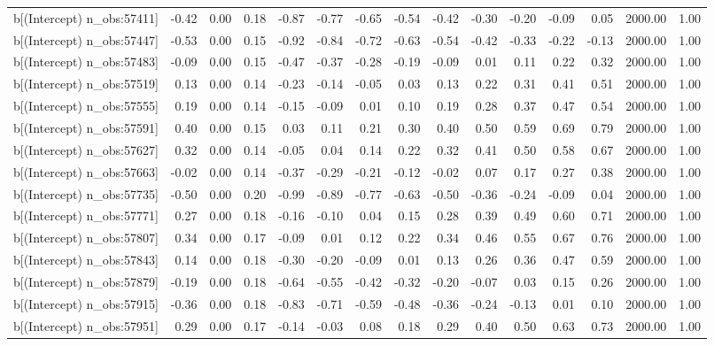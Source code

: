 \begin{table}[ht]
\begin{tabular}{rrrrrrrrrrrrrrr}
  b[(Intercept) n\_obs:57411] & -0.42 & 0.00 & 0.18 & -0.87 & -0.77 & -0.65 & -0.54 & -0.42 & -0.30 & -0.20 & -0.09 & 0.05 & 2000.00 & 1.00 \\ 
  b[(Intercept) n\_obs:57447] & -0.53 & 0.00 & 0.15 & -0.92 & -0.84 & -0.72 & -0.63 & -0.54 & -0.42 & -0.33 & -0.22 & -0.13 & 2000.00 & 1.00 \\ 
  b[(Intercept) n\_obs:57483] & -0.09 & 0.00 & 0.15 & -0.47 & -0.37 & -0.28 & -0.19 & -0.09 & 0.01 & 0.11 & 0.22 & 0.32 & 2000.00 & 1.00 \\ 
  b[(Intercept) n\_obs:57519] & 0.13 & 0.00 & 0.14 & -0.23 & -0.14 & -0.05 & 0.03 & 0.13 & 0.22 & 0.31 & 0.41 & 0.51 & 2000.00 & 1.00 \\ 
  b[(Intercept) n\_obs:57555] & 0.19 & 0.00 & 0.14 & -0.15 & -0.09 & 0.01 & 0.10 & 0.19 & 0.28 & 0.37 & 0.47 & 0.54 & 2000.00 & 1.00 \\ 
  b[(Intercept) n\_obs:57591] & 0.40 & 0.00 & 0.15 & 0.03 & 0.11 & 0.21 & 0.30 & 0.40 & 0.50 & 0.59 & 0.69 & 0.79 & 2000.00 & 1.00 \\ 
  b[(Intercept) n\_obs:57627] & 0.32 & 0.00 & 0.14 & -0.05 & 0.04 & 0.14 & 0.22 & 0.32 & 0.41 & 0.50 & 0.58 & 0.67 & 2000.00 & 1.00 \\ 
  b[(Intercept) n\_obs:57663] & -0.02 & 0.00 & 0.14 & -0.37 & -0.29 & -0.21 & -0.12 & -0.02 & 0.07 & 0.17 & 0.27 & 0.38 & 2000.00 & 1.00 \\ 
  b[(Intercept) n\_obs:57735] & -0.50 & 0.00 & 0.20 & -0.99 & -0.89 & -0.77 & -0.63 & -0.50 & -0.36 & -0.24 & -0.09 & 0.04 & 2000.00 & 1.00 \\ 
  b[(Intercept) n\_obs:57771] & 0.27 & 0.00 & 0.18 & -0.16 & -0.10 & 0.04 & 0.15 & 0.28 & 0.39 & 0.49 & 0.60 & 0.71 & 2000.00 & 1.00 \\ 
  b[(Intercept) n\_obs:57807] & 0.34 & 0.00 & 0.17 & -0.09 & 0.01 & 0.12 & 0.22 & 0.34 & 0.46 & 0.55 & 0.67 & 0.76 & 2000.00 & 1.00 \\ 
  b[(Intercept) n\_obs:57843] & 0.14 & 0.00 & 0.18 & -0.30 & -0.20 & -0.09 & 0.01 & 0.13 & 0.26 & 0.36 & 0.47 & 0.59 & 2000.00 & 1.00 \\ 
  b[(Intercept) n\_obs:57879] & -0.19 & 0.00 & 0.18 & -0.64 & -0.55 & -0.42 & -0.32 & -0.20 & -0.07 & 0.03 & 0.15 & 0.26 & 2000.00 & 1.00 \\ 
  b[(Intercept) n\_obs:57915] & -0.36 & 0.00 & 0.18 & -0.83 & -0.71 & -0.59 & -0.48 & -0.36 & -0.24 & -0.13 & 0.01 & 0.10 & 2000.00 & 1.00 \\ 
  b[(Intercept) n\_obs:57951] & 0.29 & 0.00 & 0.17 & -0.14 & -0.03 & 0.08 & 0.18 & 0.29 & 0.40 & 0.50 & 0.63 & 0.73 & 2000.00 & 1.00 \\ 

\end{tabular}
\end{table}
